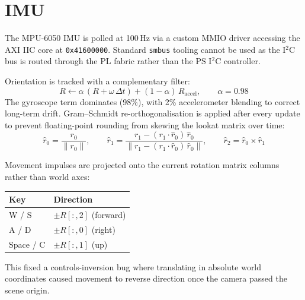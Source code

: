   \section{IMU}
   
  The MPU-6050 IMU is polled at 100\,Hz via a custom MMIO driver accessing                                                  
  the AXI IIC core at \texttt{0x41600000}. Standard \texttt{smbus} tooling
  cannot be used as the I$^2$C bus is routed through the PL fabric rather
  than the PS I$^2$C controller.

  Orientation is tracked with a complementary filter:
  \[
    R \leftarrow \alpha\,(R + \omega\,\Delta t) + (1-\alpha)\,R_{\text{accel}},
    \qquad \alpha = 0.98
  \]
  The gyroscope term dominates (98\%), with 2\% accelerometer blending to
  correct long-term drift. Gram--Schmidt re-orthogonalisation is applied
  after every update to prevent floating-point rounding from skewing the
  lookat matrix over time:
  \[                                                                                                                        
    \hat{r}_0 = \frac{r_0}{\|r_0\|}, \qquad
    \hat{r}_1 = \frac{r_1 - (r_1 \cdot \hat{r}_0)\,\hat{r}_0}                                                               
                     {\|r_1 - (r_1 \cdot \hat{r}_0)\,\hat{r}_0\|}, \qquad
    \hat{r}_2 = \hat{r}_0 \times \hat{r}_1
  \]

  Movement impulses are projected onto the current rotation matrix columns
  rather than world axes:

  \begin{center}
  \begin{tabular}{ll}
  \hline
  \textbf{Key} & \textbf{Direction} \\
  \hline
  W / S        & $\pm R[:,2]$ (forward) \\
  A / D        & $\pm R[:,0]$ (right)   \\
  Space / C    & $\pm R[:,1]$ (up)      \\
  \hline
  \end{tabular}
  \end{center}

  This fixed a controls-inversion bug where translating in absolute world
  coordinates caused movement to reverse direction once the camera passed
  the scene origin.

